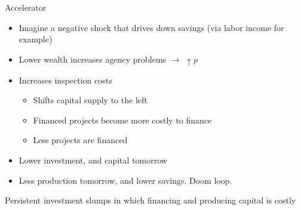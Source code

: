 \documentclass[11pt,aspectratio=169,xcolor={dvipsnames},hyperref={pdftex,pdfpagemode=UseNone,hidelinks,pdfdisplaydoctitle=true},usepdftitle=false]{beamer}
\begin{document}
\begin{frame}{Accelerator}
\begin{itemize}
\item Imagine a negative shock that drives down savings (via labor income for example)
\item Lower wealth increases agency problems $\rightarrow$ $\uparrow p$
\item Increases inspection costs
\begin{itemize}
\item Shifts capital supply to the left
\item Financed projects become more costly to finance
\item Less projects are financed
\end{itemize}
\item Lower investment, and capital tomorrow
\item Less production tomorrow, and lower savings. Doom loop.
\end{itemize}
Persistent investment slumps in which financing and producing capital is costly
\end{frame}
\end{document}
